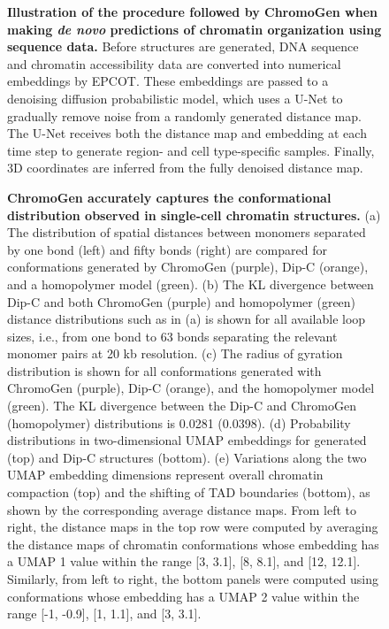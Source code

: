 \documentclass[12pt,letterpaper]{article}
\begin{document}
\begin{figure}[H]
    \caption{\textbf{Illustration of the procedure followed by ChromoGen when making \emph{de novo} predictions of chromatin organization using sequence data.}
    Before structures are generated, DNA sequence and chromatin accessibility data are converted into numerical embeddings by EPCOT. 
    These embeddings are passed to a denoising diffusion probabilistic model, which uses a U-Net to gradually remove noise from a randomly generated distance map. 
    The U-Net receives both the distance map and embedding at each time step to generate region- and cell type-specific samples.  
    Finally, 3D coordinates are inferred from the fully denoised distance map. }
    \label{fig:design}
\end{figure}

\begin{figure}[H]
    \centering
    \caption{
    \textbf{ChromoGen accurately captures the conformational distribution observed in single-cell chromatin structures.} 
    (a)
    The distribution of spatial distances between monomers separated by one bond (left) and fifty bonds (right) are compared for conformations generated by ChromoGen (purple), Dip-C (orange), and a homopolymer model (green). 
    (b)
    The KL divergence between Dip-C and both ChromoGen (purple) and homopolymer (green) distance distributions such as in (a) is shown for all available loop sizes, i.e., from one bond to 63 bonds separating the relevant monomer pairs at 20 kb resolution. 
    (c)
    The radius of gyration distribution is shown for all conformations generated with ChromoGen (purple), Dip-C (orange), and the homopolymer model (green). 
    The KL divergence between the Dip-C and ChromoGen (homopolymer) distributions is 0.0281 (0.0398). 
    (d)
    Probability distributions in two-dimensional UMAP embeddings for generated (top) and Dip-C structures (bottom).    
    (e) Variations along the two UMAP embedding dimensions represent overall chromatin compaction (top) and the shifting of TAD boundaries (bottom), as shown by the corresponding average distance maps.
    From left to right, the distance maps in the top row were computed by averaging the distance maps of chromatin conformations whose embedding has a UMAP 1 value within the range [3, 3.1], [8, 8.1], and [12, 12.1]. Similarly, from left to right, the bottom panels were computed using conformations whose embedding has a UMAP 2 value within the range [-1, -0.9], [1, 1.1], and [3, 3.1].
    }
    \label{fig:unguided_ensemble}
\end{figure}
\end{document}
